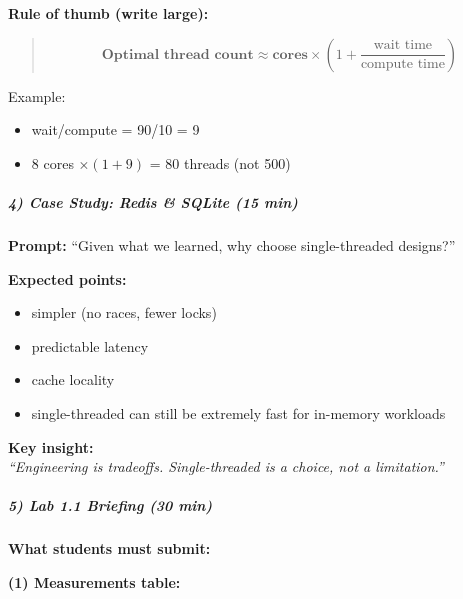 \documentclass[11pt,a4paper]{article}
\begin{document}
\textbf{Rule of thumb (write large):}
\begin{quote}
	\[
	\textbf{Optimal thread count} \approx
	\textbf{cores}\times\left(1+\frac{\text{wait time}}{\text{compute time}}\right)
	\]
\end{quote}


Example:
\begin{itemize}[leftmargin=*]
\item wait/compute = 90/10 = 9
\item 8 cores $\times (1 + 9)$ = 80 threads (not 500)
\end{itemize}

\subparagraph{4) Case Study: Redis \& SQLite (15 min)}

\textbf{Prompt:} ``Given what we learned, why choose single-threaded designs?''

\textbf{Expected points:}
\begin{itemize}[leftmargin=*]
\item simpler (no races, fewer locks)
\item predictable latency
\item cache locality
\item single-threaded can still be extremely fast for in-memory workloads
\end{itemize}

\textbf{Key insight:}\\
\textit{``Engineering is tradeoffs. Single-threaded is a choice, not a limitation.''}

\subparagraph{5) Lab 1.1 Briefing (30 min)}

\textbf{What students must submit:}

\textbf{(1) Measurements table:}
\end{document}
